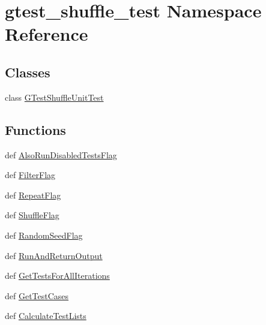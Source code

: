 \hypertarget{namespacegtest__shuffle__test}{\section{gtest\-\_\-shuffle\-\_\-test Namespace Reference}
\label{namespacegtest__shuffle__test}
}
\subsection*{Classes}
\begin{DoxyCompactItemize}
\item 
class \hyperlink{classgtest__shuffle__test_1_1_g_test_shuffle_unit_test}{G\-Test\-Shuffle\-Unit\-Test}
\end{DoxyCompactItemize}
\subsection*{Functions}
\begin{DoxyCompactItemize}
\item 
def \hyperlink{namespacegtest__shuffle__test_aa17301025facdaa1591c5a5d5410f837}{Also\-Run\-Disabled\-Tests\-Flag}
\item 
def \hyperlink{namespacegtest__shuffle__test_a4a93f7e13b5e23134c98eefcda7f5d5f}{Filter\-Flag}
\item 
def \hyperlink{namespacegtest__shuffle__test_a25f08fd6d8005f63e1c7a609756c624d}{Repeat\-Flag}
\item 
def \hyperlink{namespacegtest__shuffle__test_a45914cdb76091c46cd46a7f2fcaf7590}{Shuffle\-Flag}
\item 
def \hyperlink{namespacegtest__shuffle__test_aa0657c364fd687636675fba51c7b94c5}{Random\-Seed\-Flag}
\item 
def \hyperlink{namespacegtest__shuffle__test_a13d2ad435ca073d858111fd77ae578e4}{Run\-And\-Return\-Output}
\item 
def \hyperlink{namespacegtest__shuffle__test_a39d093b6415900460c3e11f5db85ad5a}{Get\-Tests\-For\-All\-Iterations}
\item 
def \hyperlink{namespacegtest__shuffle__test_ac74f1a346d22dbe51d4a4fa3b3b6ae1b}{Get\-Test\-Cases}
\item 
def \hyperlink{namespacegtest__shuffle__test_a52bc4812a258c3d1606540722e76c44a}{Calculate\-Test\-Lists}
\end{DoxyCompactItemize}
